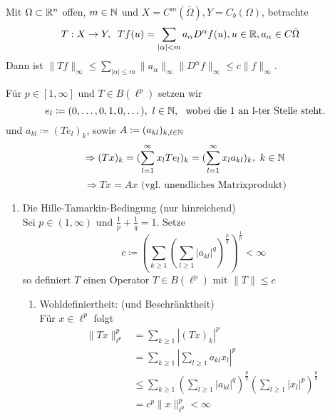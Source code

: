 \begin{beispiel}[Differentialoperatoren] 
	Mit $\Omega \subset \mathbb{R}^n$ offen, $m \in \mathbb{N}$ und $X = C^{m}(\bar \Omega), Y = C_{b}(\Omega)$, betrachte
	\begin{align*}
		T:X \rightarrow Y, & \hspace{0.25cm} Tf(u) = \sum_{|\alpha| < m} a_{\alpha} D^{\alpha} f(u), u \in \mathbb{R}, a_{\alpha} \in C{\bar \Omega}
  	\end{align*}
    Dann ist $\| Tf \|_{\infty} \leq \sum_{|\alpha| \leq m} \| a_{\alpha} \|_{\infty} \| D^{\alpha} f \|_{\infty} \leq c \|f\|_{\infty}$.
\end{beispiel}

\begin{beispiel}[Matrizenmultiplikation] 
	Für $p \in [1, \infty]$ und $T \in B(\ell^{p})$ setzen wir 
	\[ e_{l} \coloneqq (0, \dotsc, 0, 1, 0, \dotsc), ~ l \in \mathbb{N}, ~ \text{ wobei die 1 an l-ter Stelle steht.} \]
	und $a_{kl} \coloneqq (T e_{l})_{k}$, sowie $A \coloneqq (a_{kl})_{k,l \in \mathbb{N}}$
	\[ \Rightarrow (Tx)_{k} = (\sum_{l = 1}^{\infty} x_{l} T e_{l})_{k} = (\sum_{ l = 1}^{\infty} x_{l} a_{kl})_{k}, ~ k \in \mathbb{N} \]
	\[  \Rightarrow T x = A x \text{ (vgl. unendliches Matrixprodukt)} \]
	\begin{enumerate}[label=\alph*\upshape)]
		\item Die Hille-Tamarkin-Bedingung (nur hinreichend) \\
			Sei $p \in (1, \infty)$ und $\frac{1}{p} + \frac{1}{q} = 1$. Setze
			\[ c \coloneqq \left( \sum_{k \geq 1} \left( \sum_{l \geq 1} |a_{kl}|^{q} \right)^{\frac{p}{q}} \right)^{\frac{1}{p}} < \infty \]
			so definiert $T$ einen Operator $T \in B(\ell^{p})$ mit $\| T \| \leq c$ 
		\begin{beweis}
			\begin{enumerate}
				\item Wohldefiniertheit: (und Beschränktheit)  \\
					Für $x \in \ell^{p}$ folgt
					\begin{align*}
						\| Tx \|_{\ell^{p}}^{p} &= \sum_{k \geq 1} | (Tx)_{k} |^{p} \\
									 	 &= \sum_{k \geq 1} | \sum_{l \geq 1} a_{kl} x_{l} |^{p} \\
										 &\leq \sum_{k \geq 1} \left( \sum_{l \geq 1} |a_{kl}|^{q} \right)^{\frac{p}{q}} \left( \sum_{l \geq 1} |x_{l}|^{p} \right)^{\frac{p}{q}} \\
										 &= c^{p} \|x\|_{\ell^{p}}^{p} < \infty

\end{align*}
\end{enumerate}
\end{beweis}
\end{enumerate}
\end{beispiel}
